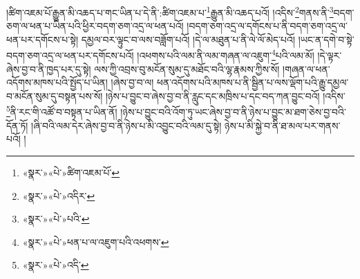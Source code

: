 །ཚིག་འཇམ་པོ་རྒྱུན་མི་འཆད་པ་གང་ཡིན་པ་དེ་ནི་:ཚིག་འཇམ་པ་\footnote{«སྣར་»«པེ་»ཚིག་འཇམ་པོ་}རྒྱུན་མི་འཆད་པའོ། །འདིས་\footnote{«སྣར་»«པེ་»འདིར་}གནས་ནི་\footnote{«སྣར་»«པེ་»པའི་}བདག་ཅག་ལ་ཕན་པ་ཡིན་པའི་ཕྱིར་བདག་ཅག་འདྲ་ལ་ཕན་པའོ། །བདག་ཅག་འདྲ་ལ་དགོངས་པ་ནི་བདག་ཅག་འདྲ་ལ་ཕན་པར་དགོངས་པ་སྟེ། དམྱལ་བར་ལྟུང་བ་ལས་བཟློག་པའོ། །དེ་ལ་མཐུན་པ་ནི་ལེ་ལོ་མེད་པའོ། །ཡང་ན་དགེ་བ་སྟེ་བདག་ཅག་འདྲ་ལ་ཕན་པར་དགོངས་པའོ། །འཕགས་པའི་ལམ་ནི་ལམ་གཞན་ལ་འཇུག་\footnote{«སྣར་»«པེ་»ཕན་པ་ལ་འཇུག་པའི་འཕགས་}པའི་ལམ་མོ། །དེ་ལྟར་ཞེས་བྱ་བ་ནི་ཁྱད་པར་དུ་སྟེ། ལས་ཀྱི་འབྲས་བུ་མངོན་སུམ་དུ་མཐོང་བའི་ལྷ་རྣམས་ཀྱིས་སོ། །གཞན་ལ་ཕན་འདོགས་མཁས་པའི་སྤྱོད་པ་ཡིན། །ཞེས་བྱ་བ་ལ། ཕན་འདོགས་པའི་མཁས་པ་ནི་སྦྱིན་པ་ལས་ལྡོག་པའི་རྒྱུ་དམྱལ་བ་མངོན་སུམ་དུ་བསྟན་པས་སོ། །ཉེས་པ་བྱུང་བ་ཞེས་བྱ་བ་ནི་རླུང་དང་མཁྲིས་པ་དང་བད་ཀན་བྱུང་བའོ། །འདིས་\footnote{«སྣར་»«པེ་»འདི་}ནི་རང་གི་འཚོ་བ་བསྟན་པ་ཡིན་ནོ། །ཉེས་པ་བྱུང་བའི་འོག་ཏུ་ཡང་ཞེས་བྱ་བ་ནི་ཉེས་པ་བྱུང་མ་ཐག་ཅེས་བྱ་བའི་དོན་ཏོ། །ཞི་བའི་ལམ་དེར་ཞེས་བྱ་བ་ནི་ཉེས་པ་མི་འབྱུང་བའི་ལམ་དུ་སྟེ། ཉེས་པ་མི་སྐྱེ་བ་ནི་ཐ་མལ་པར་གནས་པའོ། །
